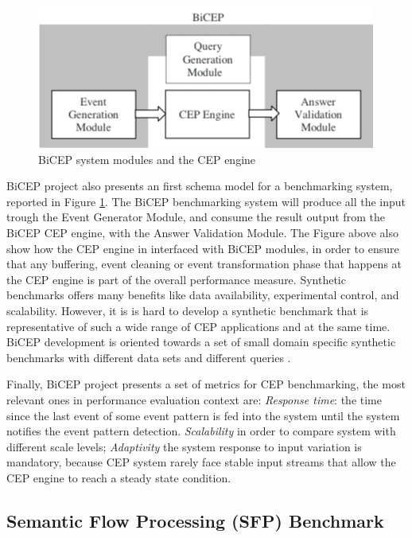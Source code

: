 \begin{figure}[tbh]
  \centering
	\includegraphics[width=\linewidth]{images/bicep_schema}
	\caption{BiCEP system  modules and the CEP engine} 
  	\label{fig:bicep-schema}
\end{figure}

BiCEP project also presents an first schema model for a benchmarking system, reported in Figure \ref{fig:bicep-schema}. The BiCEP benchmarking system will produce all the input trough the Event Generator Module, and consume the result output from the BiCEP CEP engine, with the Answer Validation Module. The Figure above also show how the CEP engine in interfaced with BiCEP modules, in order to ensure that any buffering, event cleaning or event transformation phase that happens at the CEP engine is part of the overall performance measure. Synthetic benchmarks offers many benefits like data availability, experimental control, and scalability. However, it is is hard to develop a synthetic benchmark that is representative of such a wide range of CEP applications and at the same time. BiCEP development is oriented towards a set of small domain specific synthetic benchmarks with different data sets and different queries \cite{bizarro:DSP:2007:1143}.

Finally, BiCEP project presents a set of metrics for CEP benchmarking, the most relevant ones in performance evaluation context are: \textit{Response time}: the time since the last event of some event pattern is fed into the system until the system notifies the event pattern detection. \textit{Scalability} in order to compare system with different scale levels; \textit{Adaptivity} the system response to input variation is mandatory, because CEP system rarely face stable input streams that allow the CEP engine to reach a steady state condition.



\subsection{Semantic Flow Processing (SFP) Benchmark}

